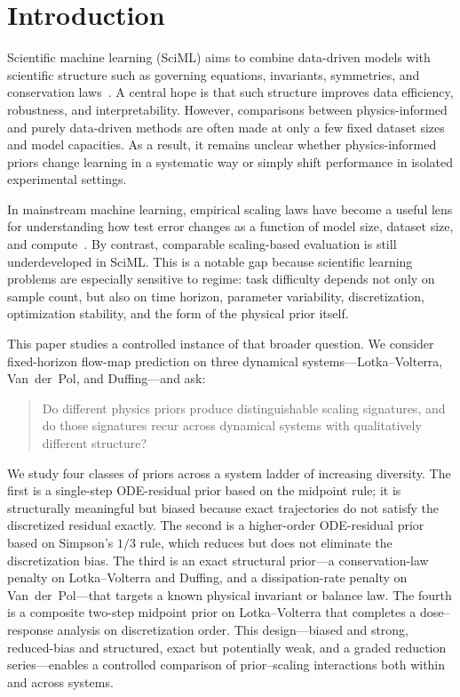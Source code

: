\documentclass[11pt]{article}
\begin{document}
\section{Introduction}

Scientific machine learning (SciML) aims to combine data-driven models with scientific structure such as governing equations, invariants, symmetries, and conservation laws~\cite{willard2022,karpatne2022}.
A central hope is that such structure improves data efficiency, robustness, and interpretability.
However, comparisons between physics-informed and purely data-driven methods are often made at only a few fixed dataset sizes and model capacities.
As a result, it remains unclear whether physics-informed priors change learning in a systematic way or simply shift performance in isolated experimental settings.

In mainstream machine learning, empirical scaling laws have become a useful lens for understanding how test error changes as a function of model size, dataset size, and compute~\cite{kaplan2020,hestness2017}.
By contrast, comparable scaling-based evaluation is still underdeveloped in SciML.
This is a notable gap because scientific learning problems are especially sensitive to regime: task difficulty depends not only on sample count, but also on time horizon, parameter variability, discretization, optimization stability, and the form of the physical prior itself.

This paper studies a controlled instance of that broader question.
We consider fixed-horizon flow-map prediction on three dynamical systems---Lotka--Volterra, Van~der~Pol, and Duffing---and ask:

\begin{quote}
Do different physics priors produce distinguishable scaling signatures, and do those signatures recur across dynamical systems with qualitatively different structure?
\end{quote}

We study four classes of priors across a system ladder of increasing diversity.
The first is a single-step ODE-residual prior based on the midpoint rule; it is structurally meaningful but biased because exact trajectories do not satisfy the discretized residual exactly.
The second is a higher-order ODE-residual prior based on Simpson's $1/3$ rule, which reduces but does not eliminate the discretization bias.
The third is an exact structural prior---a conservation-law penalty on Lotka--Volterra and Duffing, and a dissipation-rate penalty on Van~der~Pol---that targets a known physical invariant or balance law.
The fourth is a composite two-step midpoint prior on Lotka--Volterra that completes a dose--response analysis on discretization order.
This design---biased and strong, reduced-bias and structured, exact but potentially weak, and a graded reduction series---enables a controlled comparison of prior--scaling interactions both within and across systems.
\end{document}
